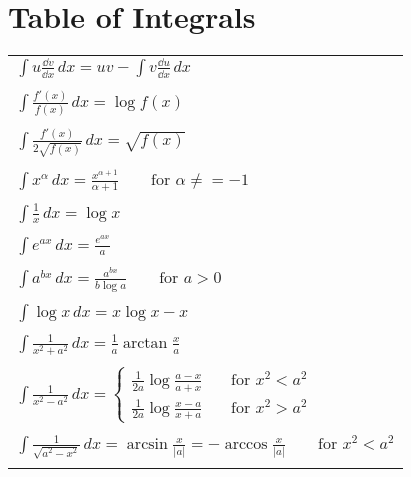 \raggedbottom
\chapter{Table of Integrals}
\label{table_of_integrals}
\raggedbottom 

\setlongtables
\begin{longtable}{l}
  $\displaystyle \int u \frac{\dd v}{\dd x}\,d x = u v - \int v \frac{\dd u}{\dd x}\,d x$ \\
  \\
  $\displaystyle \int \frac{f'(x)}{f(x)}\,d x = \log f(x)$ \\
  \\
  $\displaystyle \int \frac{f'(x)}{2 \sqrt{f(x)}}\,d x = \sqrt{f(x)}$ \\
  \\
  $\displaystyle \int x^\alpha\,d x = \frac{x^{\alpha+1}}{\alpha+1} 
  \qquad \text{for }\alpha \neq = -1$ \\
  \\
  $\displaystyle \int \frac{1}{x}\,d x = \log x$ \\
  \\
  $\displaystyle \int e^{a x}\,d x = \frac{e^{a x}}{a}$ \\
  \\
  $\displaystyle \int a^{b x}\,d x = \frac{a^{b x}}{b \log a} 
  \qquad \text{for }a > 0$ \\
  \\
  $\displaystyle \int \log x\,d x = x \log x - x$ \\
  \\
  $\displaystyle \int \frac{1}{x^2 + a^2}\,d x 
  = \frac{1}{a} \arctan \frac{x}{a}$ \\
  \\
  $\displaystyle \int \frac{1}{x^2-a^2}\,d x = 
  \begin{cases}
    \frac{1}{2a} \log \frac{a-x}{a+x} \quad &\text{for }x^2 < a^2 \\
    \frac{1}{2a} \log \frac{x-a}{x+a} \quad &\text{for }x^2 > a^2
  \end{cases}$ \\
  \\
  $\displaystyle \int \frac{1}{\sqrt{a^2-x^2}}\,d x = \arcsin \frac{x}{|a|} 
  = - \arccos \frac{x}{|a|} \qquad \text{for } x^2 < a^2$ \\
  \\

\end{longtable}
